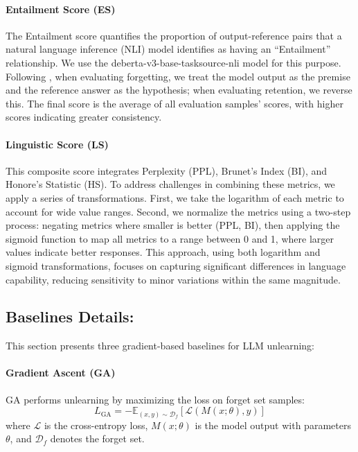 \paragraph{Entailment Score (ES)} The Entailment score quantifies the proportion of output-reference pairs that a natural language inference (NLI) model identifies as having an ``Entailment'' relationship.
We use the deberta-v3-base-tasksource-nli model \citep{sileo2023tasksource} for this purpose. 
Following \citet{yuan2024closerlookmachineunlearning}, when evaluating forgetting, we treat the model output as the premise and the reference answer as the hypothesis; 
when evaluating retention, we reverse this. 
The final score is the average of all evaluation samples' scores, with higher scores indicating greater consistency.

\paragraph{Linguistic Score (LS)}
This composite score integrates Perplexity (PPL), Brunet's Index (BI), and Honore's Statistic (HS). 
To address challenges in combining these metrics, we apply a series of transformations. 
First, we take the logarithm of each metric to account for wide value ranges. 
Second, we normalize the metrics using a two-step process: negating metrics where smaller is better (PPL, BI), then applying the sigmoid function to map all metrics to a range between 0 and 1, where larger values indicate better responses.
This approach, using both logarithm and sigmoid transformations, focuses on capturing significant differences in language capability, reducing sensitivity to minor variations within the same magnitude.

\subsection{Baselines Details:}
\label{section:baselines}
This section presents three gradient-based baselines for LLM unlearning: 
\paragraph{Gradient Ascent (GA)} GA performs unlearning by maximizing the loss on forget set samples:
\begin{equation}
L_{\text{GA}} = -\mathbb{E}_{(x,y) \sim \mathcal{D}_f} [\mathcal{L}(M(x; \theta), y)]
\end{equation}
where \(\mathcal{L}\) is the cross-entropy loss, \(M(x; \theta)\) is the model output with parameters \(\theta\), and \(\mathcal{D}_f\) denotes the forget set.

